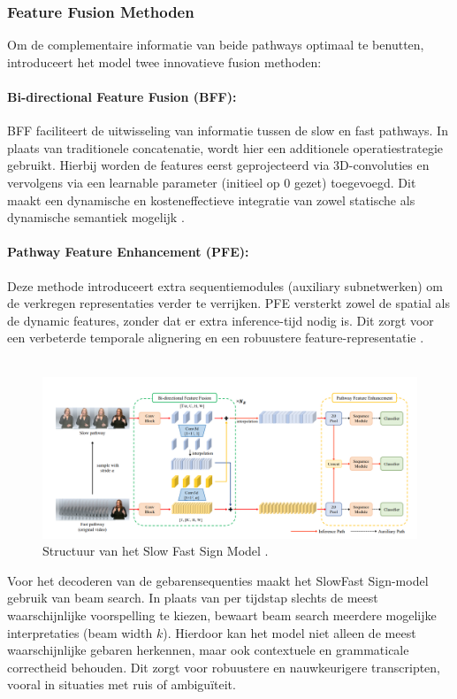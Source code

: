 \subsubsection{Feature Fusion Methoden}
Om de complementaire informatie van beide pathways optimaal te benutten, introduceert het model twee innovatieve fusion methoden:
\paragraph{Bi-directional Feature Fusion (BFF):}
BFF faciliteert de uitwisseling van informatie tussen de slow en fast pathways. 
In plaats van traditionele concatenatie, wordt hier een additionele operatiestrategie gebruikt. 
Hierbij worden de features eerst geprojecteerd via 3D-convoluties en vervolgens via een learnable parameter (initieel op 0 gezet) toegevoegd. 
Dit maakt een dynamische en kosteneffectieve integratie van zowel statische als dynamische semantiek mogelijk \autocite{10445841}.
\paragraph{Pathway Feature Enhancement (PFE):}
Deze methode introduceert extra sequentiemodules (auxiliary subnetwerken) om de verkregen representaties verder te verrijken. 
PFE versterkt zowel de spatial als de dynamic features, zonder dat er extra inference-tijd nodig is. 
Dit zorgt voor een verbeterde temporale alignering en een robuustere feature-representatie \autocite{10445841}.
\\
\\
\begin{figure}[h!]
  \includegraphics[width=1\textwidth]{../graphics/structuurSlowFast.png}
  \caption{Structuur van het Slow Fast Sign Model \autocite{10445841}.}
  \label{fig:structuur_slowFast}
\end{figure}

Voor het decoderen van de gebarensequenties maakt het SlowFast Sign-model gebruik van beam search. 
In plaats van per tijdstap slechts de meest waarschijnlijke voorspelling te kiezen, bewaart beam search meerdere mogelijke interpretaties (beam width $k$). 
Hierdoor kan het model niet alleen de meest waarschijnlijke gebaren herkennen, maar ook contextuele en grammaticale correctheid behouden. 
Dit zorgt voor robuustere en nauwkeurigere transcripten, vooral in situaties met ruis of ambiguïteit\autocite{10445841}.

